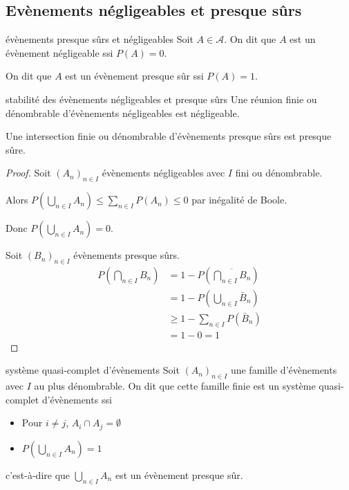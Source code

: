 \subsection{Evènements négligeables et presque sûrs }

\begin{definition}{évènements presque sûrs et négligeables}{}
    Soit $A \in \mathcal A$. On dit que $A$ est un évènement négligeable ssi $P(A) = 0$.

    On dit que $A$ est un évènement presque sûr ssi $P(A) = 1$.
\end{definition}

\begin{proposition}{}{stabilité des évènements négligeables et presque sûrs}{}
    Une réunion finie ou dénombrable d'évènements négligeables est négligeable. 

    Une intersection finie ou dénombrable d'évènements presque sûrs est presque sûre.
\end{proposition}


\begin{proof}
    Soit $(A_n)_{n \in I}$ évènements négligeables avec $I$ fini ou dénombrable.

    Alors $\displaystyle P\left( \bigcup_{n \in I} A_n \right) \leqslant \sum_{n \in I} P(A_n) \leqslant 0$
    par inégalité de Boole.

    Donc $\displaystyle P\left( \bigcup_{n \in I} A_n \right) = 0$. 

    Soit $(B_n)_{n \in I}$ évènements presque sûrs. 
    \begin{align}
        P\left( \bigcap_{n \in I} B_n \right) & = 1 - P\left( \overline{ \bigcap_{n \in I} B_n } \right) \\
        & = 1 - P\left( \bigcup_{n \in I} \bar B_n \right) \\
        & \geqslant 1 - \sum_{n \in I} P(\bar B_n) \\
        & = 1 - 0 = 1
    \end{align}

\end{proof}

\begin{definition}{système quasi-complet d'évènements}{}
    Soit $(A_n)_{n \in I}$ une famille d'évènements avec $I$ au plus dénombrable. On dit que cette famille
    finie est un système quasi-complet d'évènements ssi 
    \begin{itemize}
        \item Pour $i \neq j$, $A_i \cap A_j = \emptyset$
        \item $\displaystyle P\left( \bigcup_{n \in I} A_n \right) = 1$
    \end{itemize}

    c'est-à-dire que $\displaystyle \bigcup_{n \in I} A_n$ est un évènement presque sûr.
\end{definition}

